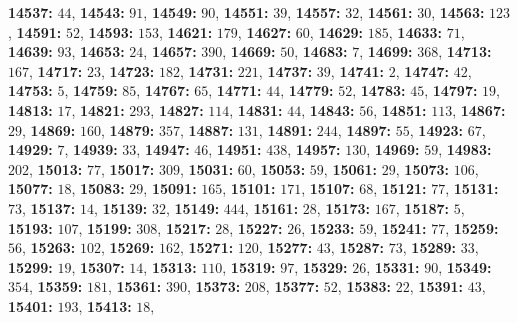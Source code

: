 \textsf{\bfseries 14537:} $44$, \textsf{\bfseries 14543:} $91$, \textsf{\bfseries 14549:} $90$, \textsf{\bfseries 14551:} $39$, \textsf{\bfseries 14557:} $32$, \textsf{\bfseries 14561:} $30$, \textsf{\bfseries 14563:} $123$, \textsf{\bfseries 14591:} $52$, \textsf{\bfseries 14593:} $153$, \textsf{\bfseries 14621:} $179$, \textsf{\bfseries 14627:} $60$, \textsf{\bfseries 14629:} $185$, \textsf{\bfseries 14633:} $71$, \textsf{\bfseries 14639:} $93$, \textsf{\bfseries 14653:} $24$, \textsf{\bfseries 14657:} $390$, \textsf{\bfseries 14669:} $50$, \textsf{\bfseries 14683:} $7$, \textsf{\bfseries 14699:} $368$, \textsf{\bfseries 14713:} $167$, \textsf{\bfseries 14717:} $23$, \textsf{\bfseries 14723:} $182$, \textsf{\bfseries 14731:} $221$, \textsf{\bfseries 14737:} $39$, \textsf{\bfseries 14741:} $2$, \textsf{\bfseries 14747:} $42$, \textsf{\bfseries 14753:} $5$, \textsf{\bfseries 14759:} $85$, \textsf{\bfseries 14767:} $65$, \textsf{\bfseries 14771:} $44$, \textsf{\bfseries 14779:} $52$, \textsf{\bfseries 14783:} $45$, \textsf{\bfseries 14797:} $19$, \textsf{\bfseries 14813:} $17$, \textsf{\bfseries 14821:} $293$, \textsf{\bfseries 14827:} $114$, \textsf{\bfseries 14831:} $44$, \textsf{\bfseries 14843:} $56$, \textsf{\bfseries 14851:} $113$, \textsf{\bfseries 14867:} $29$, \textsf{\bfseries 14869:} $160$, \textsf{\bfseries 14879:} $357$, \textsf{\bfseries 14887:} $131$, \textsf{\bfseries 14891:} $244$, \textsf{\bfseries 14897:} $55$, \textsf{\bfseries 14923:} $67$, \textsf{\bfseries 14929:} $7$, \textsf{\bfseries 14939:} $33$, \textsf{\bfseries 14947:} $46$, \textsf{\bfseries 14951:} $438$, \textsf{\bfseries 14957:} $130$, \textsf{\bfseries 14969:} $59$, \textsf{\bfseries 14983:} $202$, \textsf{\bfseries 15013:} $77$, \textsf{\bfseries 15017:} $309$, \textsf{\bfseries 15031:} $60$, \textsf{\bfseries 15053:} $59$, \textsf{\bfseries 15061:} $29$, \textsf{\bfseries 15073:} $106$, \textsf{\bfseries 15077:} $18$, \textsf{\bfseries 15083:} $29$, \textsf{\bfseries 15091:} $165$, \textsf{\bfseries 15101:} $171$, \textsf{\bfseries 15107:} $68$, \textsf{\bfseries 15121:} $77$, \textsf{\bfseries 15131:} $73$, \textsf{\bfseries 15137:} $14$, \textsf{\bfseries 15139:} $32$, \textsf{\bfseries 15149:} $444$, \textsf{\bfseries 15161:} $28$, \textsf{\bfseries 15173:} $167$, \textsf{\bfseries 15187:} $5$, \textsf{\bfseries 15193:} $107$, \textsf{\bfseries 15199:} $308$, \textsf{\bfseries 15217:} $28$, \textsf{\bfseries 15227:} $26$, \textsf{\bfseries 15233:} $59$, \textsf{\bfseries 15241:} $77$, \textsf{\bfseries 15259:} $56$, \textsf{\bfseries 15263:} $102$, \textsf{\bfseries 15269:} $162$, \textsf{\bfseries 15271:} $120$, \textsf{\bfseries 15277:} $43$, \textsf{\bfseries 15287:} $73$, \textsf{\bfseries 15289:} $33$, \textsf{\bfseries 15299:} $19$, \textsf{\bfseries 15307:} $14$, \textsf{\bfseries 15313:} $110$, \textsf{\bfseries 15319:} $97$, \textsf{\bfseries 15329:} $26$, \textsf{\bfseries 15331:} $90$, \textsf{\bfseries 15349:} $354$, \textsf{\bfseries 15359:} $181$, \textsf{\bfseries 15361:} $390$, \textsf{\bfseries 15373:} $208$, \textsf{\bfseries 15377:} $52$, \textsf{\bfseries 15383:} $22$, \textsf{\bfseries 15391:} $43$, \textsf{\bfseries 15401:} $193$, \textsf{\bfseries 15413:} $18$, 
